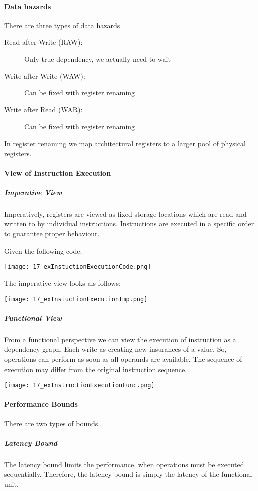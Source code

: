 \paragraph{Data hazards}
There are three types of data hazards

\begin{description}
    \item[Read after Write (RAW):]  Only true dependency, we actually need to wait
    \item[Write after Write (WAW):] Can be fixed with  register renaming
    \item[Write after Read (WAR):] Can be fixed with register renaming
\end{description}

In register renaming we map architectural registers to a larger pool of physical registers.

\paragraph{View of Instruction Execution}
\subparagraph{Imperative View}
Imperatively, registers are viewed as fixed storage locations which are read and written to by individual instructions. Instructions are executed in a specific order to guarantee proper behaviour.

Given the following code:

\texttt{[image: 17\_exInstuctionExecutionCode.png]}

The imperative view looks als follows:

\texttt{[image: 17\_exInstuctionExecutionImp.png]}

\subparagraph{Functional View}
From a functional perspective we can view the execution of instruction as a dependency graph. Each write as creating new insurances of a value. So, operations can perform as soon as all operands are available. The sequence of execution may differ from the original instruction sequence.

\texttt{[image: 17\_exInstructionExecutionFunc.png]}

\paragraph{Performance Bounds}
There are two types of bounds.
\subparagraph{Latency Bound}
The latency bound limits the performance, when operations must be executed sequentially. Therefore, the latency bound is simply the latency of the functional unit.

